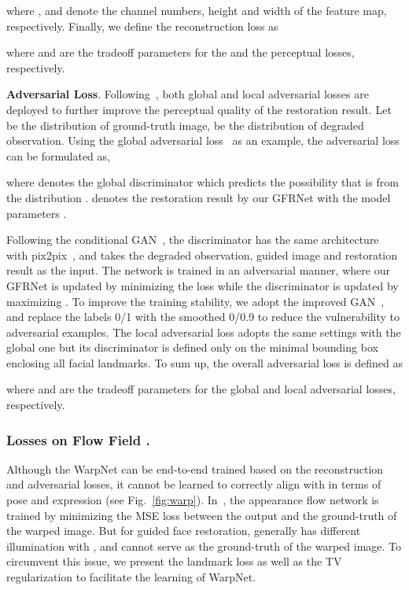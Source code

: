 \documentclass[runningheads]{llncs}
\begin{document}
where ,  and  denote the channel numbers, height and width of the feature map, respectively.
Finally, we define the reconstruction loss as

where  and  are the tradeoff parameters for the  and the perceptual losses, respectively.

\textbf{Adversarial Loss}.
Following~\cite{li2017generative,iizuka2017globally}, both global and local adversarial losses are deployed to further improve the perceptual quality of the restoration result.
Let  be the distribution of ground-truth image,  be the distribution of degraded observation.
Using the global adversarial loss~\cite{Goodfellow2014Generative} as an example, the adversarial loss can be formulated as,

where  denotes the global discriminator which predicts the possibility that  is from the distribution .  denotes the restoration result by our GFRNet with the model parameters .


Following the conditional GAN~\cite{pix2pix2016}, the discriminator has the same architecture with pix2pix~\cite{pix2pix2016}, and takes the degraded observation, guided image and restoration result as the input.
The network is trained in an adversarial manner, where our GFRNet is updated by minimizing the loss  while the discriminator is updated by maximizing .
To improve the training stability, we adopt the improved GAN~\cite{SalimansGZCRC16}, and replace the labels 0/1 with the smoothed 0/0.9 to reduce the vulnerability to adversarial examples.
The local adversarial loss  adopts the same settings with the global one but its discriminator is defined only on the minimal bounding box enclosing all facial landmarks.
To sum up, the overall adversarial loss is defined as

where  and  are the tradeoff parameters for the global and local adversarial losses, respectively.
\subsubsection{Losses on Flow Field .}
Although the WarpNet can be end-to-end trained based on the reconstruction and adversarial losses,
it cannot be learned to correctly align  with  in terms of pose and expression (see Fig.~\ref{fig:warp}).
In~\cite{ganin2016deepwarp,yeh2016semantic}, the appearance flow network is trained by minimizing the MSE loss between the output and the ground-truth of the warped image.
But for guided face restoration,  generally has different illumination with , and cannot serve as the ground-truth of the warped image.
To circumvent this issue, we present the landmark loss as well as the TV regularization to facilitate the learning of WarpNet.
\end{document}
